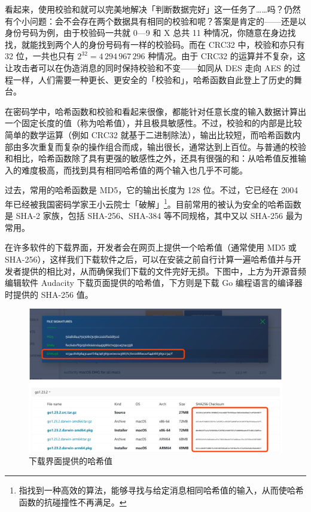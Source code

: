 看起来，使用校验和就可以完美地解决「判断数据完好」这一任务了……吗？仍然有个小问题：会不会存在两个数据具有相同的校验和呢？答案是肯定的——还是以身份号码为例，由于校验码一共就 0—9 和 X 总共 11 种情况，你随意在身边找找，就能找到两个人的身份号码有一样的校验码。而在 CRC32 中，校验和亦只有 32 位，一共也只有 $2^{32}=4\,294\,967\,296$ 种情况。由于 CRC32 的运算并不复杂，这让攻击者可以在伪造消息的同时保持校验和不变——如同从 DES 走向 AES 的过程一样，人们需要一种更长、更安全的「校验和」，哈希函数自此登上了历史的舞台。

在密码学中，哈希函数和校验和看起来很像，都能针对任意长度的输入数据计算出一个固定长度的值（称为哈希值），并且极具敏感性。不过，校验和的内部是比较简单的数学运算（例如 CRC32 就基于二进制除法），输出比较短，而哈希函数内部由多次重复而复杂的操作组合而成，输出很长，通常达到上百位。与普通的校验和相比，哈希函数除了具有更强的敏感性之外，还具有很强的和：从哈希值反推输入的难度极高，而找到具有相同哈希值的两个输入也几乎不可能。

过去，常用的哈希函数是 MD5，它的输出长度为 128 位。不过，它已经在 2004 年已经被我国密码学家王小云院士「破解」\footnote{指找到一种高效的算法，能够寻找与给定消息相同哈希值的输入，从而使哈希函数的抗碰撞性不再满足。}。目前常用的被认为安全的哈希函数是 SHA-2 家族，包括 SHA-256、SHA-384 等不同规格，其中又以 SHA-256 最为常用。

在许多软件的下载界面，开发者会在网页上提供一个哈希值（通常使用 MD5 或 SHA-256），这样我们下载软件之后，可以在安装之前自行计算一遍哈希值并与开发者提供的相比对，从而确保我们下载的文件完好无损。下图中，上方为开源音频编辑软件 Audacity 下载页面提供的哈希值，下方则是下载 Go 编程语言的编译器时提供的 SHA-256 值。

\begin{figure}[htb!]
  \centering
  \includegraphics[width=.7\textwidth]{assets/surpass/Hashes_at_download_page.png}
  \caption{下载界面提供的哈希值}
  \label{fig:Hashes_at_download_page}
\end{figure}

